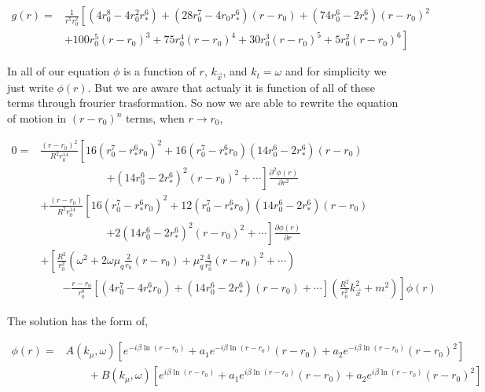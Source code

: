 \begin{align}
    g(r) =& \frac{1}{r^5r_0^2} \left[ (4r_0^8-4r_0^2r_*^6) + (28r_0^7-4r_0r_*^6)(r-r_0) + (74r_0^6-2r_*^6)(r-r_0)^2 \right. \nonumber\\
          &  \left. + 100r_0^5(r-r_0)^3 + 75r_0^4(r-r_0)^4 + 30r_0^3(r-r_0)^5 + 5r_0^2(r-r_0)^6 \right]
\end{align}

In all of our equation $\phi$ is a function of $r$, $k_{\vec{x}}$, and $k_t=\omega$ and for simplicity we just write $\phi(r)$. But we are aware that actualy it is function of all of these terms through frourier trasformation. So now we are able to rewrite the equation of motion in $(r-r_0)^n$ terms, when $r \rightarrow r_0$,

\begin{align}
    0 =& \frac{(r-r_0)^2}{R^2r_0^{14}}\left[16(r_0^7-r_*^6r_0)^2 + 16(r_0^7-r_*^6r_0)(14r_0^6-2r_*^6)(r-r_0) \right. \nonumber\\
       & \qquad \qquad \qquad  \left. + (14r_0^6-2r_*^6)^2(r-r_0)^2 + \cdots \right] \frac{\partial^2\phi(r)}{\partial r^2} \nonumber\\
       & + \frac{(r-r_0)}{R^2r_0^{14}}\left[16(r_0^7-r_*^6r_0)^2 + 12(r_0^7-r_*^6r_0)(14r_0^6-2r_*^6)(r-r_0) \right. \\
       & \qquad \qquad \qquad \left. + 2(14r_0^6-2r_*^6)^2(r-r_0)^2 + \cdots \right] \frac{\partial\phi(r)}{\partial r} \nonumber\\
       & + \left[ \frac{R^2}{r_0^2}\left(\omega^2+2\omega\mu_q\frac{2}{r_0}(r-r_0)+ \mu_q^2\frac{4}{r_0^2}(r-r_0)^2 +\cdots\right) \right. \nonumber\\
       & \qquad \left. - \frac{r-r_0}{r_0^8} \left[(4r_0^7-4r_*^6r_0) + (14r_0^6-2r_*^6)(r-r_0) + \cdots \right] \left( \frac{R^2}{r_0^2}k_{\vec{x}}^2 + m^2 \right) \right] \phi(r) \nonumber
\end{align}

The solution has the form of,

\begin{align}
    \phi(r) =& A(k_\mu,\omega)\left[e^{-i\beta\ln{(r-r_0)}}+a_1e^{-i\beta\ln{(r-r_0)}}(r-r_0)+ a_2e^{-i\beta\ln{(r-r_0)}}(r-r_0)^2\right] \nonumber\\
            & \qquad + B(k_\mu,\omega)\left[e^{i\beta\ln{(r-r_0)}}+a_1e^{i\beta\ln{(r-r_0)}}(r-r_0)+ a_2e^{i\beta\ln{(r-r_0)}}(r-r_0)^2\right]
\end{align}

